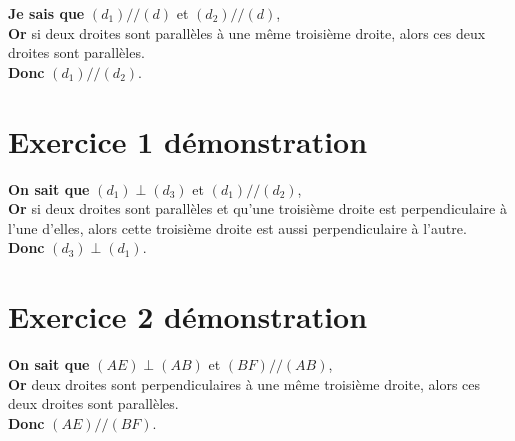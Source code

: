\documentclass[12pt,a4paper]{article}
\begin{document}
\noindent \textbf{Je sais que} $(d_1) // (d)$ et $(d_2) // (d)$,\\
\textbf{Or} si deux droites sont parallèles à une même troisième droite, alors ces deux droites sont parallèles.\\
\textbf{Donc} $(d_1) // (d_2)$.

\section*{Exercice 1 démonstration}


\noindent \textbf{On sait que} $(d_1) \perp (d_3)$ et $(d_1) // (d_2)$,\\
\textbf{Or} si deux droites sont parallèles et qu'une troisième droite est perpendiculaire à l'une d'elles, alors cette troisième droite est aussi perpendiculaire à l'autre.\\
\textbf{Donc} $(d_3) \perp (d_1)$.


\section*{Exercice 2 démonstration}


\noindent \textbf{On sait que} $(AE) \perp (AB)$ et $(BF) // (AB)$,\\
\textbf{Or} deux droites sont perpendiculaires à une même troisième droite, alors ces deux droites sont parallèles.\\
\textbf{Donc} $(AE) // (BF)$.
\end{document}
